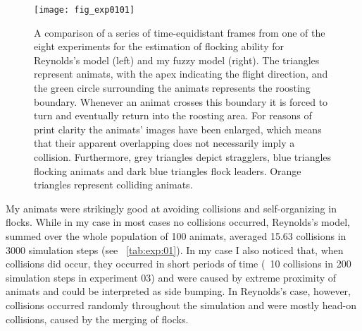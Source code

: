 \begin{figure}[p]
	\null\vspace*{1mm}
	\texttt{[image: fig\_exp0101]}
	\par\vspace*{1mm}
	\caption{A comparison of a series of time-equidistant frames from one of the eight experiments for the estimation of flocking ability for Reynolds's model \cite{reynolds:1999} (left) and my fuzzy model (right). The triangles represent animats, with the apex indicating the flight direction, and the green circle surrounding the animats represents the roosting boundary. Whenever an animat crosses this boundary it is forced to turn and eventually return into the roosting area. For reasons of print clarity the animats' images have been enlarged, which means that their apparent overlapping does not necessarily imply a collision. Furthermore, grey triangles depict stragglers, blue triangles flocking animats and dark blue triangles flock leaders. Orange triangles represent colliding animats.}
	\label{fig:exp:01:01}
\end{figure}
\afterpage{\clearpage}

My animats were strikingly good at avoiding collisions and self-organizing in flocks. While in my case in most cases no collisions occurred, Reynolds's model, summed over the whole population of 100 animats, averaged 15.63 collisions in 3000 simulation steps (see \tab~\ref{tab:exp:01}). In my case I also noticed that, when collisions did occur, they occurred in short periods of time (\eg\ 10 collisions in 200 simulation steps in experiment 03) and were caused by extreme proximity of animats and could be interpreted as side bumping. In Reynolds's case, however, collisions occurred randomly throughout the simulation and were mostly head-on collisions, caused by the merging of flocks. 

